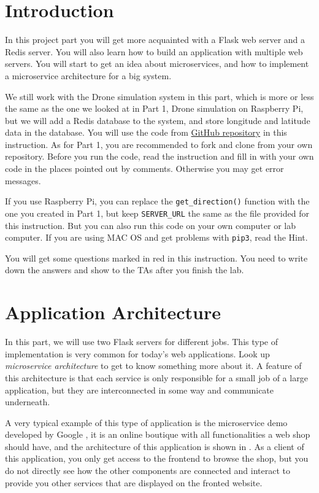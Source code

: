 \documentclass{article}
\begin{document}
\section{Introduction}
In this project part you will get more acquainted with a Flask web server and a Redis server. You will also learn how to build an application with multiple web servers. You will start to get an idea about microservices, and how to implement a microservice architecture for a big system.

We still work with the Drone simulation system in this part, which is more or less the same as the one we looked at in Part 1, Drone simulation on Raspberry Pi, but we will add a Redis database to the system, and store longitude and latitude data in the database.
You will use the code from  {\color{blue}\href{https://github.com/HaoruiPeng/InfoCom-LP2-Lab2}{GitHub repository} }in this instruction. As for Part 1, you are recommended to fork and clone from your own repository. Before you run the code, read the instruction and fill in with your own code in the places pointed out by comments. Otherwise you may get error messages.

If you use Raspberry Pi, you can replace the \verb!get_direction()! function with the one you created in Part 1, but keep \verb!SERVER_URL! the same as the file provided for this instruction. But you can also run this code on your own computer or lab computer. If you are using MAC OS and get problems with \verb!pip3!, read the Hint.\vspace{0.3cm}

\parbox[t]{14cm}{{You will get some questions marked in red in this instruction. You need to write down the answers and show to the TAs after you finish the lab.}}\vspace{0.2cm}

\section{Application Architecture}

In this part, we will use two Flask servers for different jobs. This type of implementation is very common for today's web applications. Look up \textit{microservice architecture} to get to know something more about it. A feature of this architecture is that each service is only responsible for a small job of a large application, but they are interconnected in some way and communicate underneath.

A very typical example of this type of application is the microservice demo developed by Google \cite{MD}, it is an online boutique with all functionalities a web shop should have, and the architecture of this application is shown in . As a client of this application, you only get access to the frontend to browse the shop, but you do not directly see how the other components are connected and interact to provide you other services that are displayed on the fronted website.
\end{document}
